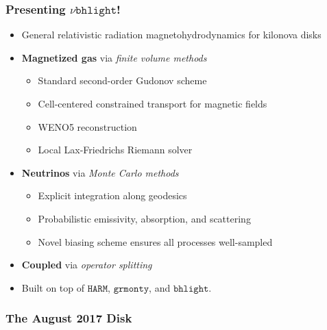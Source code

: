 \documentclass[]{beamer}
\begin{document}
\begin{frame}
  \frametitle{Presenting $\nu\texttt{bhlight}$!}
  \begin{itemize}
  \item General relativistic radiation magnetohydrodynamics for kilonova disks
  \item \textbf{Magnetized gas} via \textit{finite volume methods}
    \begin{itemize}
    \item Standard second-order Gudonov scheme
    \item Cell-centered constrained transport for magnetic fields
    \item WENO5 reconstruction
    \item Local Lax-Friedrichs Riemann solver
    \end{itemize}
  \item \textbf{Neutrinos} via \textit{Monte Carlo methods}
    \begin{itemize}
    \item Explicit integration along geodesics
    \item Probabilistic emissivity, absorption, and scattering
    \item Novel biasing scheme ensures all processes well-sampled
    \end{itemize}
  \item \textbf{Coupled} via \textit{operator splitting}
  \item Built on top of $\texttt{HARM}$, $\texttt{grmonty}$, and
    $\texttt{bhlight}$.
  \end{itemize}
\end{frame}

\begin{frame}
  \frametitle{The August 2017 Disk}
  \begin{center}
     \\
  \end{center}
\end{frame}

\end{document}

